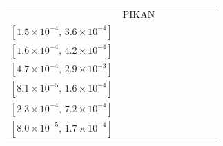 \begin{tabular}{llcccccc}
 & PIKAN & \makecell{$2.4{\times}10^{-4}$\\{\scriptsize$[1.5{\times}10^{-4},\,3.6{\times}10^{-4}]$}} & \makecell{$2.6{\times}10^{-4}$\\{\scriptsize$[1.6{\times}10^{-4},\,4.2{\times}10^{-4}]$}} & \makecell{$1.2{\times}10^{-3}$\\{\scriptsize$[4.7{\times}10^{-4},\,2.9{\times}10^{-3}]$}} & \makecell{$\mathbf{1.1{\times}10^{-4}}$\\{\scriptsize$[8.1{\times}10^{-5},\,1.6{\times}10^{-4}]$}} & \makecell{$4.1{\times}10^{-4}$\\{\scriptsize$[2.3{\times}10^{-4},\,7.2{\times}10^{-4}]$}} & \makecell{$1.2{\times}10^{-4}$\\{\scriptsize$[8.0{\times}10^{-5},\,1.7{\times}10^{-4}]$}}\\
\bottomrule
\end{tabular}